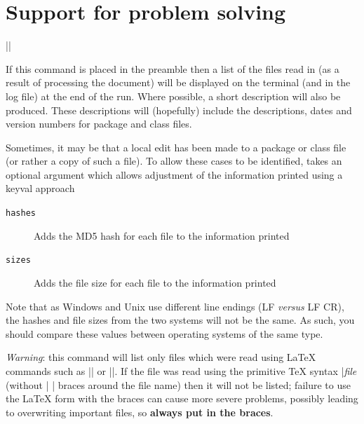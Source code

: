 \documentclass{ltxguide}
\begin{document}
\section{Support for problem solving}

\begin{decl}
  |\listfiles| 
\end{decl}

If this command is placed in the preamble then a list of the files
read in (as a result of processing the document) will be displayed
on the terminal (and in the log file) at the end of the run. Where
possible, a short description will also be produced. These descriptions
will (hopefully) include the descriptions, dates and version numbers
for package and class files.

Sometimes, it may be that a local edit has been made to a package or
class file (or rather a copy of such a file). To allow these cases to
be identified,  takes an optional argument which allows
adjustment of the information printed using a keyval approach
\begin{description}
  \item[\texttt{hashes}] Adds the MD5 hash for each file to the
    information printed
  \item[\texttt{sizes}] Adds the file size for each file to the
    information printed
\end{description}
Note that as Windows and Unix use different line endings (LF \emph{versus} LF
CR), the hashes and file sizes from the two systems will not be the same. As
such, you should compare these values between operating systems of the same
type.

\emph{Warning}: this command will list only files which were read
using \LaTeX{} commands such as || or
||.  If the file was read using the primitive \TeX{}
syntax |\emph{file} (without |{ }| braces around the file name)
then it will not be listed; failure to use the \LaTeX{} form with the
braces can cause more severe problems, possibly leading to overwriting
important files, so \textbf{always put in the braces}.
\end{document}
